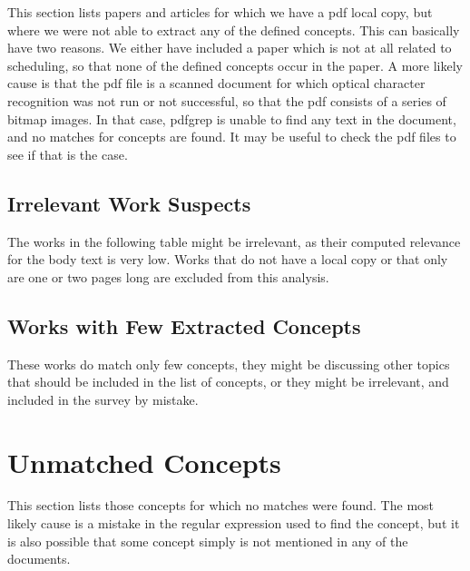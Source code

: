 \documentclass[a4paper]{article}
\begin{document}
This section lists papers and articles for which we have a pdf local copy, but where we were not able to extract any of the defined concepts. This can basically have two reasons. We either have included a paper which is not at all related to scheduling, so that none of the defined concepts occur in the paper. A  more likely cause is that the pdf file is a scanned document for which optical character recognition was not run or not successful, so that the pdf consists of a series of bitmap images. In that case, pdfgrep is unable to find any text in the document, and no matches for concepts are found. It may be useful to check the pdf files to see if that is the case.









\subsection{Irrelevant Work Suspects}
The works in the following table might be irrelevant, as their computed relevance for the body text is very low. Works that do not have a local copy or that only are one or two pages long are excluded from this analysis.




\subsection{Works with Few Extracted Concepts}

These works do match only few concepts, they might be discussing other topics that should be included in the list of concepts, or they might be irrelevant, and included in the survey by mistake.




\clearpage
\section{Unmatched Concepts}

This section lists those concepts for which no matches were found. The most likely cause is a mistake in the regular expression used to find the concept, but it is also possible that some concept simply is not mentioned in any of the documents. 
\end{document}
